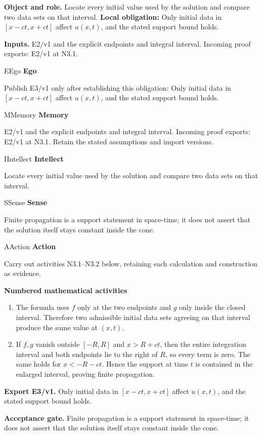 \documentclass[preprint,12pt,aps,pra,showkeys,amsmath,amssymb,superscriptaddress,floatfix]{revtex4-2}
\theoremstyle{definition}
\theoremstyle{remark}
\newcommand{\mmfaculty}[3]{%
 \begin{mmfacultybox}{#1}{#2}
 {\sffamily\bfseries\color{MMBlue}#2}\par\smallskip #3
 \end{mmfacultybox}}
\newcommand{\field}[2]{\par\smallskip\noindent\textbf{#1.} #2\par}
\begin{document}
\field{Object and role}{Locate every initial value used by the solution and compare two data
sets on that interval. \textbf{Local obligation:} Only initial data in
\([x-ct,x+ct]\) affect \(u(x,t)\), and the stated support bound holds.}

\field{Inputs}{E2/v1 and the explicit endpoints and integral interval. Incoming proof
exports: E2/v1 at N3.1.}

\mmfaculty{E}{Ego}{Publish E3/v1 only after establishing this obligation: Only initial data
in \([x-ct,x+ct]\) affect \(u(x,t)\), and the stated support bound
holds.}

\mmfaculty{M}{Memory}{E2/v1 and the explicit endpoints and integral interval. Incoming proof
exports: E2/v1 at N3.1. Retain the stated assumptions and import
versions.}

\mmfaculty{I}{Intellect}{Locate every initial value used by the solution and compare two data
sets on that interval.}

\mmfaculty{S}{Sense}{Finite propagation is a support statement in space-time; it does not
assert that the solution itself stays constant inside the cone.}

\mmfaculty{A}{Action}{Carry out activities N3.1--N3.2 below, retaining each calculation and
construction as evidence.}

\smallskip\noindent\textbf{Numbered mathematical activities}

\begin{enumerate}[label=N3.\arabic*,leftmargin=3.4em]

\item The formula uses \(f\) only at the two endpoints and \(g\) only inside
the closed interval. Therefore two admissible initial data sets agreeing
on that interval produce the same value at \((x,t)\).

\item If \(f,g\) vanish outside \([-R,R]\) and \(x>R+ct\), then the entire
integration interval and both endpoints lie to the right of \(R\), so
every term is zero. The same holds for \(x<-R-ct\). Hence the support at
time \(t\) is contained in the enlarged interval, proving finite
propagation.

\end{enumerate}

\field{Export E3/v1}{Only initial data in \([x-ct,x+ct]\) affect \(u(x,t)\), and the stated
support bound holds.}

\field{Acceptance gate}{Finite propagation is a support statement in space-time; it does not
assert that the solution itself stays constant inside the cone.}
\end{document}

